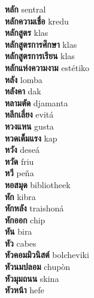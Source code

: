 \textbf{ หลัก  } sentral \\
\textbf{ หลักความเชื่อ  } kredu \\
\textbf{ หลักสูตร  } klas \\
\textbf{ หลักสูตรการศึกษา  } klas \\
\textbf{ หลักสูตรการเรียน  } klas \\
\textbf{ หลักแห่งความงาม  } estétiko \\
\textbf{ หลัง  } lomba \\
\textbf{ หลังคา  } dak \\
\textbf{ หลามตัด  } djamanta \\
\textbf{ หลีกเลี่ยง  } evitá \\
\textbf{ หวงแหน  } gusta \\
\textbf{ หวดเต็มแรง  } kap \\
\textbf{ หวัง  } deseá \\
\textbf{ หวัด  } friu \\
\textbf{ หวี  } peña \\
\textbf{ หอสมุด  } bibliotheek \\
\textbf{ หัก  } kibra \\
\textbf{ หักหลัง  } traishoná \\
\textbf{ หักออก  } chip \\
\textbf{ หัน  } bira \\
\textbf{ หัว  } cabes \\
\textbf{ หัวคอมมิวนิสต์  } bolcheviki \\
\textbf{ หัวนมปลอม  } chupòn \\
\textbf{ หัวมุมถนน  } skina \\
\textbf{ หัวหน้า  } hefe \\
